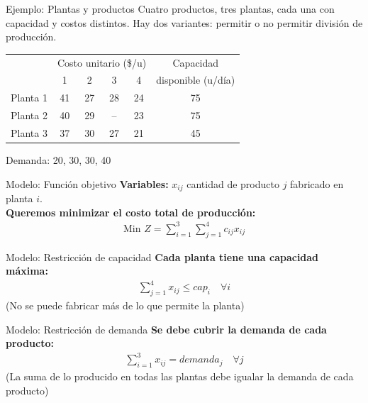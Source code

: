 \documentclass{beamer}
\begin{document}
\begin{frame}{Ejemplo: Plantas y productos}
    Cuatro productos, tres plantas, cada una con capacidad y costos distintos. Hay dos variantes: permitir o no permitir división de producción.
    \begin{table}[H]
        \centering
        \begin{tabular}{c|cccc|c}
            \toprule
             & \multicolumn{4}{c|}{Costo unitario (\$/u)} & Capacidad \\
             & 1 & 2 & 3 & 4 & disponible (u/día) \\
            \midrule
            Planta 1 & 41 & 27 & 28 & 24 & 75 \\
            Planta 2 & 40 & 29 & -- & 23 & 75 \\
            Planta 3 & 37 & 30 & 27 & 21 & 45 \\
            \bottomrule
        \end{tabular}
    \end{table}
    Demanda: 20, 30, 30, 40
\end{frame}

\begin{frame}{Modelo: Función objetivo}
    \textbf{Variables:} $x_{ij}$ cantidad de producto $j$ fabricado en planta $i$.
    \\[0.5em]
    \textbf{Queremos minimizar el costo total de producción:}
    \begin{align*}
        \text{Min } Z = \sum_{i=1}^{3} \sum_{j=1}^{4} c_{ij} x_{ij}
    \end{align*}
\end{frame}

\begin{frame}{Modelo: Restricción de capacidad}
    \textbf{Cada planta tiene una capacidad máxima:}
    \begin{align*}
        \sum_{j=1}^{4} x_{ij} \leq cap_i \quad \forall i
    \end{align*}
    (No se puede fabricar más de lo que permite la planta)
\end{frame}

\begin{frame}{Modelo: Restricción de demanda}
    \textbf{Se debe cubrir la demanda de cada producto:}
    \begin{align*}
        \sum_{i=1}^{3} x_{ij} = demanda_j \quad \forall j
    \end{align*}
    (La suma de lo producido en todas las plantas debe igualar la demanda de cada producto)
\end{frame}
\end{document}
